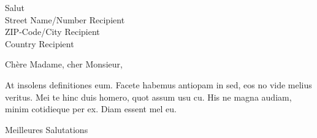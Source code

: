 \documentclass[
    SN, %
    backaddress=true, %
    fontsize=12pt,
    fromalign=left,
    fromemail=true,
    fromfax=false,
    fromphone=true,
    fromrule=off, %
    fromurl=false,
    numericaldate=false,
    paper=a4,
    enlargefirstpage=true,
    parskip=full, %
    parskip=half,
    pagenumber=footcenter,
    subject=beforeopening,
    subject=left,
    subject=titled,
    foldmarks=true, %
    foldmarks=bhlmPtv, %
]{scrlttr2}
\begin{document}
\begin{letter}{Salut\\
    Street Name/Number Recipient\\
    ZIP-Code/City Recipient\\
    Country Recipient
}

\opening{Chère Madame, cher Monsieur,}

    At insolens definitiones eum. Facete habemus antiopam in sed, eos no vide melius veritus. Mei te hinc duis homero, quot assum usu cu. His ne magna audiam, minim cotidieque per ex. Diam essent mel eu.

\closing{Meilleures Salutations}



\end{letter}
\end{document}
